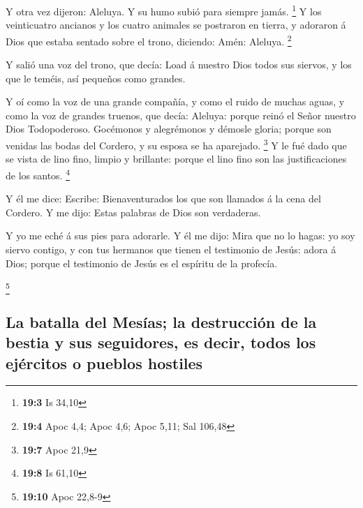  Y otra vez dijeron: Aleluya. Y su humo subió para siempre
jamás. \footnote{\textbf{19:3} Is 34,10}  Y los veinticuatro
ancianos y los cuatro animales se postraron en tierra, y adoraron á Dios
que estaba sentado sobre el trono, diciendo: Amén: Aleluya. \footnote{\textbf{19:4}
  Apoc 4,4; Apoc 4,6; Apoc 5,11; Sal 106,48}

 Y salió una voz del trono, que decía: Load á nuestro Dios
todos sus siervos, y los que le teméis, así pequeños como grandes.

 Y oí como la voz de una grande compañía, y como el ruido de
muchas aguas, y como la voz de grandes truenos, que decía: Aleluya:
porque reinó el Señor nuestro Dios Todopoderoso.  Gocémonos
y alegrémonos y démosle gloria; porque son venidas las bodas del
Cordero, y su esposa se ha aparejado. \footnote{\textbf{19:7} Apoc 21,9}
 Y le fué dado que se vista de lino fino, limpio y
brillante: porque el lino fino son las justificaciones de los santos.
\footnote{\textbf{19:8} Is 61,10}

 Y él me dice: Escribe: Bienaventurados los que son llamados
á la cena del Cordero. Y me dijo: Estas palabras de Dios son verdaderas.

 Y yo me eché á sus pies para adorarle. Y él me dijo: Mira
que no lo hagas: yo soy siervo contigo, y con tus hermanos que tienen el
testimonio de Jesús: adora á Dios; porque el testimonio de Jesús es el
espíritu de la profecía.

\footnote{\textbf{19:10} Apoc 22,8-9}

\hypertarget{la-batalla-del-mesuxedas-la-destrucciuxf3n-de-la-bestia-y-sus-seguidores-es-decir-todos-los-ejuxe9rcitos-o-pueblos-hostiles}{%
\subsection{La batalla del Mesías; la destrucción de la bestia y sus
seguidores, es decir, todos los ejércitos o pueblos
hostiles}\label{la-batalla-del-mesuxedas-la-destrucciuxf3n-de-la-bestia-y-sus-seguidores-es-decir-todos-los-ejuxe9rcitos-o-pueblos-hostiles}}

